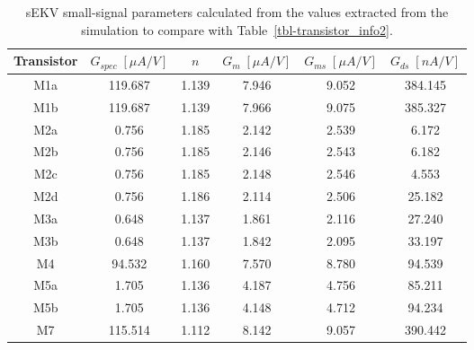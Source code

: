 \documentclass[
  a4paper,
  DIV=11,
  numbers=noendperiod]{scrreprt}
\begin{document}
\begin{longtable}[]{@{}cccccc@{}}

\caption{\label{tbl-ng_op5}sEKV small-signal parameters calculated from
the values extracted from the simulation to compare with
Table~\ref{tbl-transistor_info2}.}

\tabularnewline

\toprule\noalign{}
Transistor & \(G_{spec}\;[\mu A/V]\) & \(n\) & \(G_m\;[\mu A/V]\) &
\(G_{ms}\;[\mu A/V]\) & \(G_{ds}\;[nA/V]\) \\
\midrule\noalign{}
\endhead
\bottomrule\noalign{}
\endlastfoot
M1a & 119.687 & 1.139 & 7.946 & 9.052 & 384.145 \\
M1b & 119.687 & 1.139 & 7.966 & 9.075 & 385.327 \\
M2a & 0.756 & 1.185 & 2.142 & 2.539 & 6.172 \\
M2b & 0.756 & 1.185 & 2.146 & 2.543 & 6.182 \\
M2c & 0.756 & 1.185 & 2.148 & 2.546 & 4.553 \\
M2d & 0.756 & 1.186 & 2.114 & 2.506 & 25.182 \\
M3a & 0.648 & 1.137 & 1.861 & 2.116 & 27.240 \\
M3b & 0.648 & 1.137 & 1.842 & 2.095 & 33.197 \\
M4 & 94.532 & 1.160 & 7.570 & 8.780 & 94.539 \\
M5a & 1.705 & 1.136 & 4.187 & 4.756 & 85.211 \\
M5b & 1.705 & 1.136 & 4.148 & 4.712 & 94.234 \\
M7 & 115.514 & 1.112 & 8.142 & 9.057 & 390.442 \\

\end{longtable}
\end{document}
